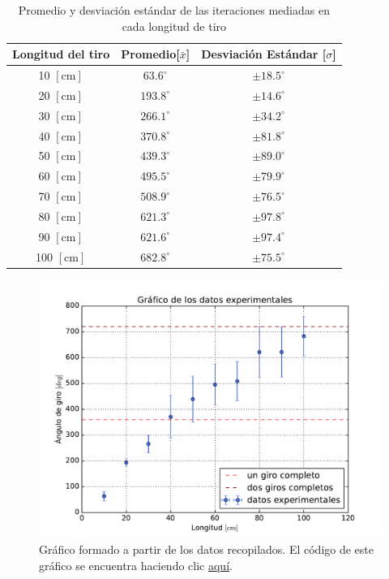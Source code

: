 \documentclass{article}
\begin{document}
\begin{table}[]
\centering
\begin{tabular}{|c|c|c|}
\hline
\small{Longitud del tiro} & Promedio[$\bar{x}$]  & Desviación Estándar [$\sigma$]\\ \hline
 10  \scriptsize{$[\text{cm}]$} & $63.6^\circ$  & $\pm 18.5^\circ$  \\ \hline
 20  \scriptsize{$[\text{cm}]$} & $193.8^\circ$ & $\pm 14.6^\circ$  \\ \hline
 30  \scriptsize{$[\text{cm}]$} & $266.1^\circ$ & $\pm 34.2^\circ$  \\ \hline
 40  \scriptsize{$[\text{cm}]$} & $370.8^\circ$ & $\pm 81.8^\circ$  \\ \hline
 50  \scriptsize{$[\text{cm}]$} & $439.3^\circ$ & $\pm 89.0^\circ$  \\ \hline
 60  \scriptsize{$[\text{cm}]$} & $495.5^\circ$ & $\pm 79.9^\circ$  \\ \hline
 70  \scriptsize{$[\text{cm}]$} & $508.9^\circ$ & $\pm 76.5^\circ$  \\ \hline
 80  \scriptsize{$[\text{cm}]$} & $621.3^\circ$ & $\pm 97.8^\circ$  \\ \hline
 90  \scriptsize{$[\text{cm}]$} & $621.6^\circ$ & $\pm 97.4^\circ$  \\ \hline
 100 \scriptsize{$[\text{cm}]$} & $682.8^\circ$ & $\pm 75.5^\circ$  \\ \hline 
\end{tabular}
\caption{Promedio y desviación estándar de las iteraciones mediadas en cada longitud de tiro}
\end{table}

\begin{figure}[ht]
    \centering
    \includegraphics[scale=0.5]{Informe/img/grafico-datos.pdf}
    \caption{Gráfico formado a partir de los datos recopilados. El código de este gráfico se encuentra haciendo clic \href{https://github.com/ayalin7/El-proyectito/blob/main/graficos/grafico-datos.py}{aquí}.}
    \label{fig:datos}
\end{figure}
\end{document}
